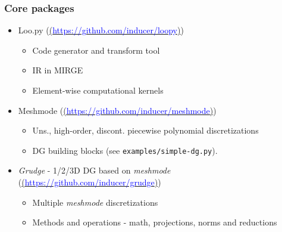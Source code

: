 \begin{frame}\frametitle{Core packages}
\begin{itemize}
  \item Loo.py (\href{https://github.com/inducer/loopy}{(\textcolor{blue}{https://github.com/inducer/loopy})})
  \begin{itemize}
    \item Code generator and transform tool
    \item IR in MIRGE
    \item Element-wise computational kernels
  \end{itemize}
  \item Meshmode (\href{https://github.com/inducer/meshmode}{(\textcolor{blue}{https://github.com/inducer/meshmode})})
  \begin{itemize}
    \item Uns., high-order, discont. piecewise polynomial discretizations 
    \item DG building blocks (see \texttt{examples/simple-dg.py}).
  \end{itemize}
  \item \textit{Grudge} - 1/2/3D DG based on \textit{meshmode} (\href{https://github.com/inducer/grudge}{(\textcolor{blue}{https://github.com/inducer/grudge})})
  \begin{itemize}
    \item Multiple \textit{meshmode} discretizations
    \item Methods and operations - math, projections, norms and reductions
  \end{itemize}
\end{itemize}
\end{frame}

